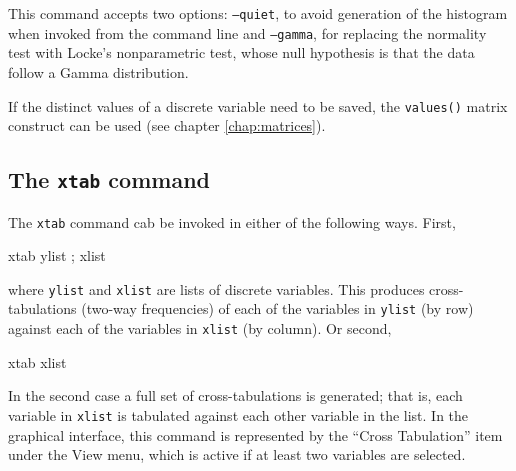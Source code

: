 This command accepts two options: \texttt{--quiet}, to avoid
generation of the histogram when invoked from the command line and
\texttt{--gamma}, for replacing the normality test with Locke's
nonparametric test, whose null hypothesis is that the data follow a
Gamma distribution.

If the distinct values of a discrete variable need to be saved, the
\texttt{values()} matrix construct can be used (see chapter
\ref{chap:matrices}).

\subsection{The \texttt{xtab} command}
\label{discr-xtab}

The \texttt{xtab} command cab be invoked in either of the following
ways.  First,
%
\begin{code}
xtab ylist ; xlist
\end{code}
%
where \texttt{ylist} and \texttt{xlist} are lists of discrete
variables.  This produces cross-tabulations (two-way frequencies) of
each of the variables in \texttt{ylist} (by row) against each of the
variables in \texttt{xlist} (by column).  Or second,
%
\begin{code}
xtab xlist
\end{code}
%
In the second case a full set of cross-tabulations is generated; that
is, each variable in \texttt{xlist} is tabulated against each other
variable in the list.  In the graphical interface, this command is
represented by the ``Cross Tabulation'' item under the View menu,
which is active if at least two variables are selected.

